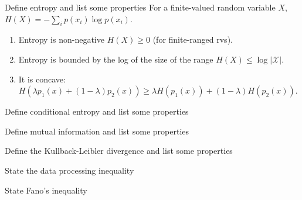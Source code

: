 \documentclass[avery5388,grid,frame]{flashcards}
\begin{document}


\begin{flashcard}
    {Define entropy and list some properties}
    For a finite-valued random variable $X$, $H(X) = - \sum_i p(x_i) \log p(x_i)$.

    \begin{enumerate}
        \item Entropy is non-negative $H(X) \geq 0$ (for finite-ranged rvs).
        \item Entropy is bounded by the log of the size of the range $H(X) \leq \log |\mathcal X|$.
        \item It is concave: $H(\lambda p_1(x) + (1-\lambda) p_2(x)) \geq \lambda H(p_1(x)) + (1- \lambda) H(p_2(x))$.
    \end{enumerate}
\end{flashcard}


\begin{flashcard}
    {Define conditional entropy and list some properties}

\end{flashcard}


\begin{flashcard}
    {Define mutual information and list some properties}

\end{flashcard}


\begin{flashcard}
    {Define the Kullback-Leibler divergence and list some properties}

\end{flashcard}


\begin{flashcard}
    {State the data processing inequality}

\end{flashcard}


\begin{flashcard}
    {State Fano's inequality}
    
\end{flashcard}
\end{document}
